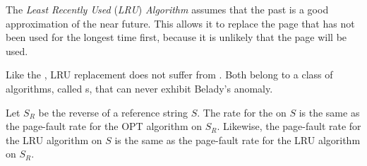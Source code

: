 \begin{definition}\label{def:LRU_Algorithm}
  The \emph{Least Recently Used} (\emph{LRU}) \emph{Algorithm} assumes that the past is a good approximation of the near future.
  This allows it to replace the page that has not been used for the longest time first, because it is unlikely that the page will be used.

  Like the , LRU replacement does not suffer from .
  Both belong to a class of  algorithms, called s, that can never exhibit Belady’s anomaly.

  \begin{remark}
    Let $S_{R}$ be the reverse of a reference string $S$.
    The  rate for the  on $S$ is the same as the page-fault rate for the OPT algorithm on $S_{R}$.
    Likewise, the page-fault rate for the LRU algorithm on $S$ is the same as the page-fault rate for the LRU algorithm on $S_{R}$.
  \end{remark}
\end{definition}

